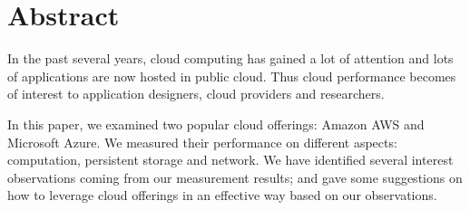 \section{Abstract}
\label{section:abstract}
In the past several years, cloud computing has gained a lot of attention and lots of applications are now hosted in public cloud. Thus cloud performance becomes of interest to application designers, cloud providers and researchers.

In this paper, we examined two popular cloud offerings: Amazon AWS and Microsoft Azure. We measured their performance on different aspects: computation, persistent storage and network. We have identified several interest observations coming from our measurement results; and gave some suggestions on how to leverage cloud offerings in an effective way based on our observations.
